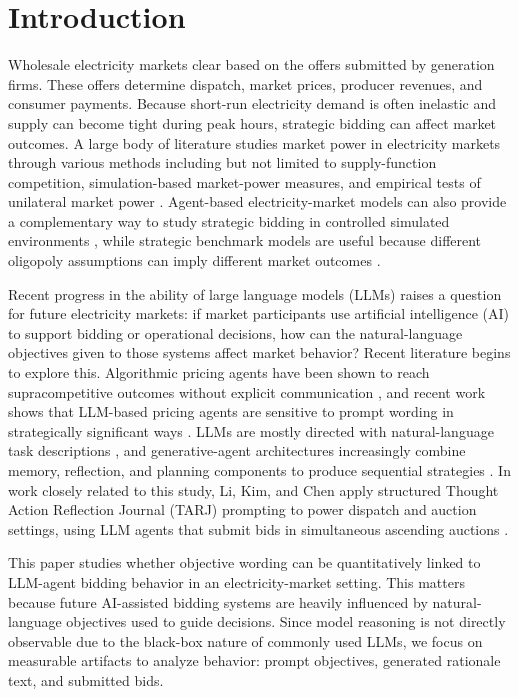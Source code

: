 \section{Introduction}

Wholesale electricity markets clear based on the offers submitted by generation firms. These offers determine dispatch, market prices, producer revenues, and consumer payments. Because short-run electricity demand is often inelastic and supply can become tight during peak hours, strategic bidding can affect market outcomes. A large body of literature studies market power in electricity markets through various methods including but not limited to supply-function competition, simulation-based market-power measures, and empirical tests of unilateral market power \cite{green1992competition,borenstein1999market,wolak2003measuring}. Agent-based electricity-market models can also provide a complementary way to study strategic bidding in controlled simulated environments \cite{weidlich2008critical}, while strategic benchmark models are useful because different oligopoly assumptions can imply different market outcomes \cite{newbery2017strategic}.

Recent progress in the ability of large language models (LLMs) raises a question for future electricity markets: if market participants use artificial intelligence (AI) to support bidding or operational decisions, how can the natural-language objectives given to those systems affect market behavior? Recent literature begins to explore this. Algorithmic pricing agents have been shown to reach supracompetitive outcomes without explicit communication \cite{calvano2020artificial}, and recent work shows that LLM-based pricing agents are sensitive to prompt wording in strategically significant ways \cite{fish2024algorithmic}. LLMs are mostly directed with natural-language task descriptions \cite{brown2020language}, and generative-agent architectures increasingly combine memory, reflection, and planning components to produce sequential strategies \cite{park2023generative}. In work closely related to this study, Li, Kim, and Chen apply structured Thought Action Reflection Journal (TARJ) prompting to power dispatch and auction settings, using LLM agents that submit bids in simultaneous ascending auctions \cite{li2026behavioral}.

This paper studies whether objective wording can be quantitatively linked to LLM-agent bidding behavior in an electricity-market setting. This matters because future AI-assisted bidding systems are heavily influenced by natural-language objectives used to guide decisions. Since model reasoning is not directly observable due to the black-box nature of commonly used LLMs, we focus on measurable artifacts to analyze behavior: prompt objectives, generated rationale text, and submitted bids.

